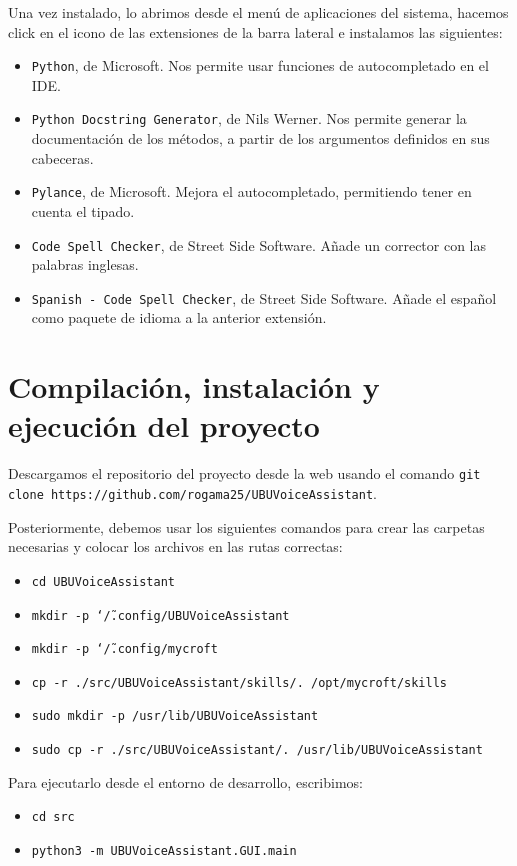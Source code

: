 Una vez instalado, lo abrimos desde el menú de aplicaciones del sistema, hacemos click en el icono de las extensiones de la barra lateral e instalamos las siguientes:
\begin{itemize}
    \item \texttt{Python}, de Microsoft. Nos permite usar funciones de autocompletado en el IDE.
    \item \texttt{Python Docstring Generator}, de Nils Werner. Nos permite generar la documentación de los métodos, a partir de los argumentos definidos en sus cabeceras.
    \item \texttt{Pylance}, de Microsoft. Mejora el autocompletado, permitiendo tener en cuenta el tipado.
    \item \texttt{Code Spell Checker}, de Street Side Software. Añade un corrector con las palabras inglesas.
    \item \texttt{Spanish - Code Spell Checker}, de Street Side Software. Añade el español como paquete de idioma a la anterior extensión.
\end{itemize}

\section{Compilación, instalación y ejecución del proyecto}
Descargamos el repositorio del proyecto desde la web usando el comando \texttt{git clone https://github.com/rogama25/UBUVoiceAssistant}.

Posteriormente, debemos usar los siguientes comandos para crear las carpetas necesarias y colocar los archivos en las rutas correctas:
\begin{itemize}
    \item \texttt{cd UBUVoiceAssistant}
    \item \texttt{mkdir -p \char`\~/.config/UBUVoiceAssistant}
    \item \texttt{mkdir -p \char`\~/.config/mycroft}
    \item \texttt{cp -r ./src/UBUVoiceAssistant/skills/. /opt/mycroft/skills}
    \item \texttt{sudo mkdir -p /usr/lib/UBUVoiceAssistant}
    \item \texttt{sudo cp -r ./src/UBUVoiceAssistant/. /usr/lib/UBUVoiceAssistant}
\end{itemize}

Para ejecutarlo desde el entorno de desarrollo, escribimos:
\begin{itemize}
    \item \texttt{cd src}
    \item \texttt{python3 -m UBUVoiceAssistant.GUI.main}
\end{itemize}


